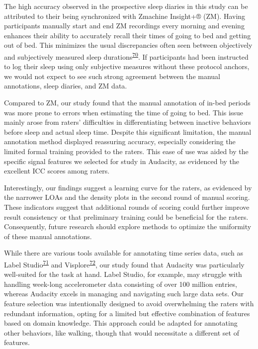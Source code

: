 \documentclass[
  9pt,
]{scrbook}
\begin{document}
The high accuracy observed in the prospective sleep diaries in this
study can be attributed to their being synchronized with Zmachine
Insight+® (ZM). Having participants manually start and end ZM recordings
every morning and evening enhances their ability to accurately recall
their times of going to bed and getting out of bed. This minimizes the
usual discrepancies often seen between objectively and subjectively
measured sleep
durations\textsuperscript{\protect\hyperlink{ref-aili_reliability_2017}{70}}.
If participants had been instructed to log their sleep using only
subjective measures without these protocol anchors, we would not expect
to see such strong agreement between the manual annotations, sleep
diaries, and ZM data.

Compared to ZM, our study found that the manual annotation of in-bed
periods was more prone to errors when estimating the time of going to
bed. This issue mainly arose from raters' difficulties in
differentiating between inactive behaviors before sleep and actual sleep
time. Despite this significant limitation, the manual annotation method
displayed reassuring accuracy, especially considering the limited formal
training provided to the raters. This ease of use was aided by the
specific signal features we selected for study in Audacity, as evidenced
by the excellent ICC scores among raters.

Interestingly, our findings suggest a learning curve for the raters, as
evidenced by the narrower LOAs and the density plots in the second round
of manual scoring. These indicators suggest that additional rounds of
scoring could further improve result consistency or that preliminary
training could be beneficial for the raters. Consequently, future
research should explore methods to optimize the uniformity of these
manual annotations.

While there are various tools available for annotating time series data,
such as Label
Studio\textsuperscript{\protect\hyperlink{ref-label_studio}{71}} and
Visplore\textsuperscript{\protect\hyperlink{ref-visplore}{72}}, our
study found that Audacity was particularly well-suited for the task at
hand. Label Studio, for example, may struggle with handling week-long
accelerometer data consisting of over 100 million entries, whereas
Audacity excels in managing and navigating such large data sets. Our
feature selection was intentionally designed to avoid overwhelming the
raters with redundant information, opting for a limited but effective
combination of features based on domain knowledge. This approach could
be adapted for annotating other behaviors, like walking, though that
would necessitate a different set of features.
\end{document}
